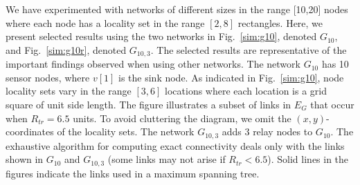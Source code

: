 We have experimented with networks of different sizes in the range
[10,20] nodes where each node has a locality set in the range $[2,8]$
rectangles.
%
Here, we present selected results using the two networks in
Fig.~\ref{sim:g10}, denoted $G_{10}$, and
Fig.~\ref{sim:g10r}, denoted $G_{10,3}$.
The selected results are representative of the important findings
observed when using other networks.
%
The network $G_{10}$ has 10 sensor nodes, where $v[1]$ is the sink node.
%
As indicated in Fig.~\ref{sim:g10}, node locality sets vary in the range
$[3,6]$ locations where each location is a grid square of unit side length.
%
The figure illustrates a subset of links in $E_G$ that occur when 
$R_{tr}= 6.5$ units.
%
To avoid cluttering the diagram, we omit the $(x,y)$-coordinates of the
locality sets.
%
The network $G_{10,3}$ adds 3 relay nodes to $G_{10}$.
%
The exhaustive algorithm for computing exact connectivity deals only
with the links shown in $G_{10}$ and $G_{10,3}$ (some links may not
arise if $R_{tr} < 6.5$).
%
Solid lines in the figures indicate the links used in a maximum spanning tree.


